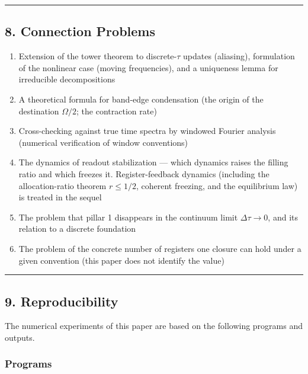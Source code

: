 \documentclass[
  a4paper,
]{article}
\providecommand{\tightlist}{%
  \setlength{\itemsep}{0pt}\setlength{\parskip}{0pt}}
\begin{document}
\begin{center}\rule{0.5\linewidth}{0.5pt}\end{center}

\subsection{8. Connection Problems}\label{connection-problems}

\begin{enumerate}
\def\labelenumi{\arabic{enumi}.}
\tightlist
\item
  Extension of the tower theorem to discrete-\(\tau\) updates
  (aliasing), formulation of the nonlinear case (moving frequencies),
  and a uniqueness lemma for irreducible decompositions
\item
  A theoretical formula for band-edge condensation (the origin of the
  destination \(\Omega/2\); the contraction rate)
\item
  Cross-checking against true time spectra by windowed Fourier analysis
  (numerical verification of window conventions)
\item
  The dynamics of readout stabilization --- which dynamics raises the
  filling ratio and which freezes it. Register-feedback dynamics
  (including the allocation-ratio theorem \(r\le1/2\), coherent
  freezing, and the equilibrium law) is treated in the sequel
\item
  The problem that pillar 1 disappears in the continuum limit
  \(\Delta\tau\to0\), and its relation to a discrete foundation
\item
  The problem of the concrete number of registers one closure can hold
  under a given convention (this paper does not identify the value)
\end{enumerate}

\begin{center}\rule{0.5\linewidth}{0.5pt}\end{center}

\subsection{9. Reproducibility}\label{reproducibility}

The numerical experiments of this paper are based on the following
programs and outputs.

\subsubsection{Programs}\label{programs}
\end{document}
